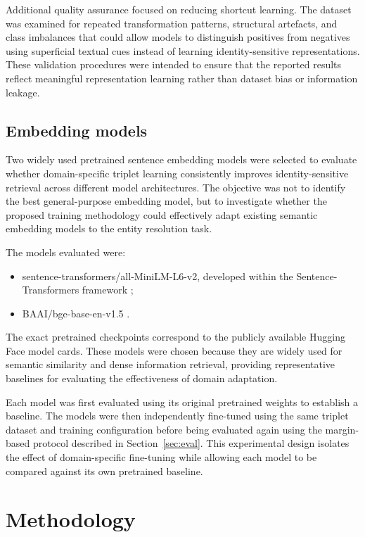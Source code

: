 \documentclass{article}
\begin{document}
Additional quality assurance focused on reducing shortcut learning. The dataset was examined for repeated transformation patterns, structural artefacts, and class imbalances that could allow models to distinguish positives from negatives using superficial textual cues instead of learning identity-sensitive representations. These validation procedures were intended to ensure that the reported results reflect meaningful representation learning rather than dataset bias or information leakage.

\subsection{Embedding models}

Two widely used pretrained sentence embedding models were selected to evaluate whether domain-specific triplet learning consistently improves identity-sensitive retrieval across different model architectures. The objective was not to identify the best general-purpose embedding model, but to investigate whether the proposed training methodology could effectively adapt existing semantic embedding models to the entity resolution task.

The models evaluated were:
\begin{itemize}
  \item sentence-transformers/all-MiniLM-L6-v2, developed within the Sentence-Transformers framework \citep{reimers2019,minilm};
  \item BAAI/bge-base-en-v1.5 \citep{xiao2023,bge}.
\end{itemize}

The exact pretrained checkpoints correspond to the publicly available Hugging Face model cards. These models were chosen because they are widely used for semantic similarity and dense information retrieval, providing representative baselines for evaluating the effectiveness of domain adaptation.

Each model was first evaluated using its original pretrained weights to establish a baseline. The models were then independently fine-tuned using the same triplet dataset and training configuration before being evaluated again using the margin-based protocol described in Section~\ref{sec:eval}. This experimental design isolates the effect of domain-specific fine-tuning while allowing each model to be compared against its own pretrained baseline.

\section{Methodology}
\label{sec:method}
\end{document}
